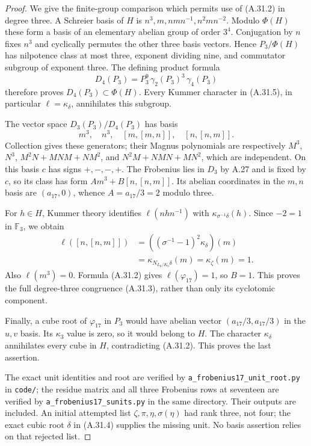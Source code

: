 \begin{proof}
We give the finite-group
comparison which permits use
of (A.31.2) in degree three.
A Schreier basis of $H$ is
$n^3,m,nmn^{-1},n^2mn^{-2}$.
Modulo $\Phi(H)$ these form
a basis of an elementary
abelian group of order $3^4$.
Conjugation by $n$ fixes
$n^3$ and cyclically permutes
the other three basis vectors.
Hence $P_3/\Phi(H)$ has
nilpotence class at most three,
exponent dividing nine, and
commutator subgroup of exponent
three. The defining product
formula
\[
 D_4(P_3)=P_3^9\,\gamma_2(P_3)^3\,
                         \gamma_4(P_3)
\]
therefore proves
$D_4(P_3)\subset\Phi(H)$.
Every Kummer character in
(A.31.5), in particular
$\ell=\kappa_\delta$, annihilates
this subgroup.

The vector space
$D_3(P_3)/D_4(P_3)$ has basis
\[
 m^3,\quad n^3,\quad
 [m,[m,n]],\quad[n,[n,m]].
 \tag{A.31.7}
\]
Collection gives these
generators; their Magnus
polynomials are respectively
$M^3$, $N^3$,
$M^2N+MNM+NM^2$, and
$N^2M+NMN+MN^2$, which are
independent. On this basis
$c$ has signs $+,-,-,+$.
The Frobenius lies in $D_3$
by A.27 and is fixed by $c$,
so its class has form
$A m^3+B[n,[n,m]]$.
Its abelian coordinates in
the $m,n$ basis are
$(a_{17},0)$, whence
$A=a_{17}/3=2$ modulo three.

For $h\in H$, Kummer theory
identifies
$\ell(nhn^{-1})$ with
$\kappa_{\sigma^{-1}\delta}(h)$.
Since $-2=1$ in $\mathbb F_3$,
we obtain
\[
 \begin{split}
 \ell([n,[n,m]])
   &=((\sigma^{-1}-1)^2\kappa_\delta)(m)\\
   &=\kappa_{N_{L_0/K_0}\delta}(m)
     =\kappa_\zeta(m)=1.
 \end{split}
 \tag{A.31.8}
\]
Also $\ell(m^3)=0$. Formula
(A.31.2) gives
$\ell(\varphi_{17})=1$,
so $B=1$. This proves the
full degree-three congruence
(A.31.3), rather than only
its cyclotomic component.

Finally, a cube root of
$\varphi_{17}$ in $P_3$
would have abelian vector
$(a_{17}/3,a_{17}/3)$ in
the $u,v$ basis. Its
$\kappa_3$ value is zero,
so it would belong to $H$.
The character $\kappa_\delta$
annihilates every cube in
$H$, contradicting (A.31.2).
This proves the last assertion.

The exact unit identities
and root are verified by
\texttt{a\_frobenius17\_unit\_root.py}
in \texttt{code/};
the residue matrix and all
three Frobenius rows at
seventeen are verified by
\texttt{a\_frobenius17\_sunits.py}
in the same directory.
Their outputs are included.
An initial attempted list
$\zeta,\pi,\eta,\sigma(\eta)$
had rank three, not four;
the exact cubic root
$\delta$ in (A.31.4)
supplies the missing unit.
No basis assertion relies
on that rejected list.
\end{proof}

